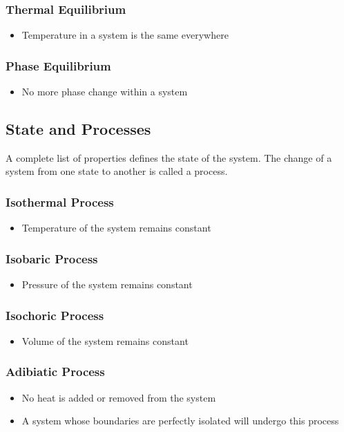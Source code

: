 \documentclass[11pt]{article}
\begin{document}
\subsubsection{Thermal Equilibrium}
\begin{itemize}
\item Temperature in a system is the same everywhere
\end{itemize}
\subsubsection{Phase Equilibrium}
\begin{itemize}
\item No more phase change within a system
\end{itemize}
\subsection{State and Processes}
A complete list of properties defines the state of the system. The change of a system from one state to another is called a process.
\subsubsection{Isothermal Process}
\begin{itemize}
\item Temperature of the system remains constant
\end{itemize}
\subsubsection{Isobaric Process}
\begin{itemize}
\item Pressure of the system remains constant
\end{itemize}
\subsubsection{Isochoric Process}
\begin{itemize}
\item Volume of the system remains constant
\end{itemize}
\subsubsection{Adibiatic Process}
\begin{itemize}
\item No heat is added or removed from the system
\item A system whose boundaries are perfectly isolated will undergo this process
\end{itemize}
\pagebreak
\end{document}
